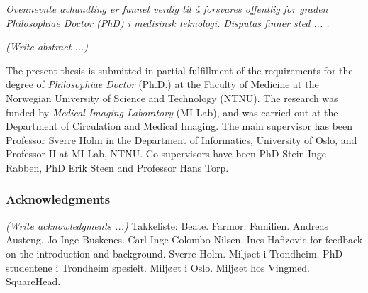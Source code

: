 \documentclass[10pt,b5paper,twoside]{book}
\newcommand\todo[1]{{\textit{\color{red}(#1)}}}
\begin{document}
\vspace{0.2cm}
\noindent \emph{Ovennevnte avhandling er funnet verdig til \aa{} forsvares offentlig for graden Philosophiae Doctor (PhD) i medisinsk teknologi. Disputas finner sted ... .}



\todo{Write abstract ...}




%
The present thesis is submitted in partial fulfillment of the requirements for the degree of \textit{Philosophiae Doctor} (Ph.D.) at the Faculty of Medicine at the Norwegian University of Science and Technology (NTNU). The research was funded by \textit{Medical Imaging Laboratory} (MI-Lab), and was carried out at the Department of Circulation and Medical Imaging. The main supervisor has been Professor Sverre Holm  in the Department of Informatics, University of Oslo, and Professor II at MI-Lab, NTNU. Co-supervisors have been PhD Stein Inge Rabben, PhD Erik Steen and Professor Hans Torp.


\subsubsection{Acknowledgments}
\todo{Write acknowledgments ...}
Takkeliste: Beate. Farmor. Familien. Andreas Austeng. Jo Inge Buskenes. Carl-Inge Colombo Nilsen. Ines Hafizovic for feedback on the introduction and background. Sverre Holm. Miljøet i Trondheim. PhD studentene i Trondheim spesielt. Miljøet i Oslo. Miljøet hos Vingmed. SquareHead.

\end{document}
